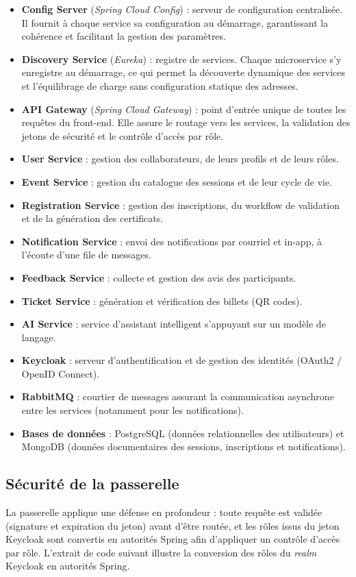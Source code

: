 \documentclass[12pt,a4paper,oneside]{report}
\begin{document}
\begin{itemize}[leftmargin=1.2cm]
  \item \textbf{Config Server} (\textit{Spring Cloud Config}) : serveur de configuration
  centralisée. Il fournit à chaque service sa configuration au démarrage, garantissant la
  cohérence et facilitant la gestion des paramètres.
  \item \textbf{Discovery Service} (\textit{Eureka}) : registre de services. Chaque
  microservice s'y enregistre au démarrage, ce qui permet la découverte dynamique des services
  et l'équilibrage de charge sans configuration statique des adresses.
  \item \textbf{API Gateway} (\textit{Spring Cloud Gateway}) : point d'entrée unique de toutes
  les requêtes du front-end. Elle assure le routage vers les services, la validation des
  jetons de sécurité et le contrôle d'accès par rôle.
  \item \textbf{User Service} : gestion des collaborateurs, de leurs profils et de leurs rôles.
  \item \textbf{Event Service} : gestion du catalogue des sessions et de leur cycle de vie.
  \item \textbf{Registration Service} : gestion des inscriptions, du workflow de validation et
  de la génération des certificats.
  \item \textbf{Notification Service} : envoi des notifications par courriel et in-app, à
  l'écoute d'une file de messages.
  \item \textbf{Feedback Service} : collecte et gestion des avis des participants.
  \item \textbf{Ticket Service} : génération et vérification des billets (QR codes).
  \item \textbf{AI Service} : service d'assistant intelligent s'appuyant sur un modèle de
  langage.
  \item \textbf{Keycloak} : serveur d'authentification et de gestion des identités (OAuth2 /
  OpenID Connect).
  \item \textbf{RabbitMQ} : courtier de messages assurant la communication asynchrone entre
  les services (notamment pour les notifications).
  \item \textbf{Bases de données} : PostgreSQL (données relationnelles des utilisateurs) et
  MongoDB (données documentaires des sessions, inscriptions et notifications).
\end{itemize}

\subsection{Sécurité de la passerelle}
La passerelle applique une défense en profondeur : toute requête est validée (signature et
expiration du jeton) avant d'être routée, et les rôles issus du jeton Keycloak sont convertis
en autorités Spring afin d'appliquer un contrôle d'accès par rôle. L'extrait de code suivant
illustre la conversion des rôles du \textit{realm} Keycloak en autorités Spring.
\end{document}
